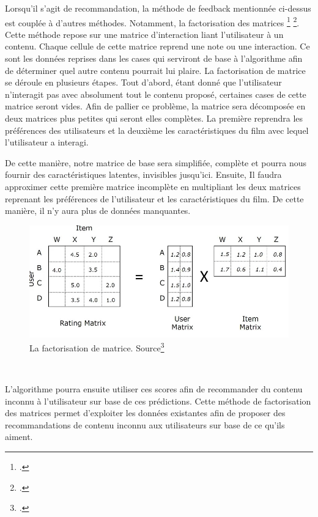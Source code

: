 \documentclass[12pt,a4paper]{article}
\begin{document}
Lorsqu'il s'agit de recommandation, la méthode de feedback mentionnée ci-dessus est couplée à d'autres méthodes. Notamment, la factorisation des matrices
\footcite{patissier2024recommandation}
\footcite{delporte2014recommandation}. Cette méthode repose sur une matrice d'interaction liant l'utilisateur à un contenu. Chaque cellule de cette matrice reprend une note ou une interaction. Ce sont les données reprises dans les cases qui serviront de base à l'algorithme afin de déterminer quel autre contenu pourrait lui plaire. La factorisation de matrice se déroule en plusieurs étapes. Tout d'abord, étant donné que l'utilisateur n'interagit pas avec  absolument tout le contenu proposé, certaines cases de cette matrice seront vides. Afin de pallier ce problème, la matrice sera décomposée en deux matrices plus petites qui seront elles complètes. La première reprendra les préférences des utilisateurs et la deuxième les caractéristiques du film avec lequel l'utilisateur a interagi. 

De cette manière, notre matrice de base sera simplifiée, complète et pourra nous fournir des caractéristiques latentes, invisibles jusqu'ici.
Ensuite, Il faudra approximer cette première matrice incomplète en multipliant les deux matrices reprenant les préférences de l'utilisateur et les caractéristiques du film. De cette manière, il n'y aura plus de données manquantes. 
\begin{figure}[h]
	\centering
	\includegraphics[scale=0.4]{Image1}
	\caption{La factorisation de matrice. Source\footcite{ghosh2018matrixfactorization}}
\end{figure}
~

L'algorithme pourra ensuite utiliser ces scores afin de recommander du contenu inconnu à l'utilisateur sur base de ces prédictions.
Cette méthode de factorisation des matrices permet d'exploiter les données existantes afin de proposer des recommandations de contenu inconnu aux utilisateurs sur base de ce qu'ils aiment.
\end{document}
